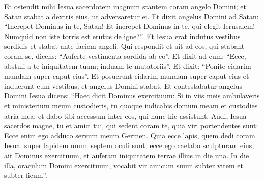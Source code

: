\begin{biblechapter}  
\verse Et ostendit mihi Iesua sacerdotem magnum stantem coram angelo Domini; et Satan stabat a dextris eius, ut adversaretur ei. 
\verse Et dixit angelus Domini ad Satan: “Increpet Dominus in te, Satan! Et increpet Dominus in te, qui elegit Ierusalem! Numquid non iste torris est erutus de igne?”. 
\verse Et Iesua erat indutus vestibus sordidis et stabat ante faciem angeli. 
\verse Qui respondit et ait ad eos, qui stabant coram se, dicens: “Auferte vestimenta sordida ab eo”. Et dixit ad eum: “Ecce, abstuli a te iniquitatem tuam; induam te mutatoriis”. 
\verse Et dixit: “Ponite cidarim mundam super caput eius”. Et posuerunt cidarim mundam super caput eius et induerunt eum vestibus; et angelus Domini stabat. 
\verse Et contestabatur angelus Domini Iesua dicens: 
\verse “Haec dicit Dominus exercituum: Si in viis meis ambulaveris et ministerium meum custodieris, tu quoque iudicabis domum meam et custodies atria mea; et dabo tibi accessum inter eos, qui nunc hic assistunt. 
\verse Audi, Iesua sacerdos magne, tu et amici tui, qui sedent coram te, quia viri portendentes sunt: Ecce enim ego adduco servum meum Germen. 
\verse Quia ecce lapis, quem dedi coram Iesua: super lapidem unum septem oculi sunt; ecce ego caelabo sculpturam eius, ait Dominus exercituum, et auferam iniquitatem terrae illius in die una. 
\verse In die illa, oraculum Domini exercituum, vocabit vir amicum suum subter vitem et subter ficum”. 
\end{biblechapter}

